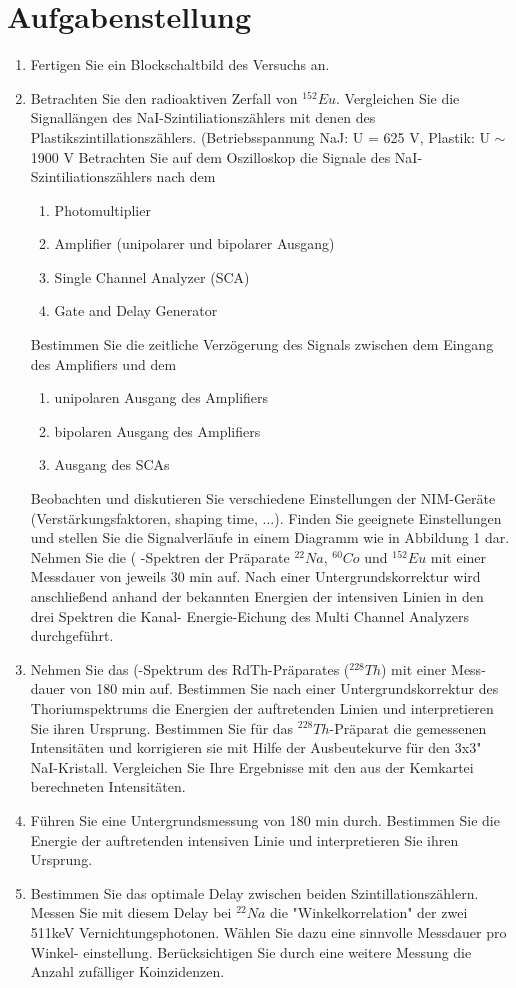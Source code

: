 \section{Aufgabenstellung}
\begin{enumerate}
 \item Fertigen Sie ein Blockschaltbild des Versuchs an.
 \item Betrachten Sie den radioaktiven Zerfall von $^{152}Eu$.
	Vergleichen Sie die Signallängen des NaI-Szintiliationszählers mit denen des
	Plastikszintillationszählers. (Betriebsspannung NaJ: U = 625 V, Plastik: U $\sim$ 1900 V
	Betrachten Sie auf dem Oszilloskop die Signale des NaI-Szintiliationszählers
	nach dem
	\begin{enumerate}
	\item Photomultiplier
	\item Amplifier (unipolarer und bipolarer Ausgang)
	\item Single Channel Analyzer (SCA)
	\item Gate and Delay Generator
	\end{enumerate}
	Bestimmen Sie die zeitliche Verzögerung des Signals zwischen dem Eingang
	des Amplifiers und dem
	\begin{enumerate}
	 \item unipolaren Ausgang des Amplifiers
	 \item bipolaren Ausgang des Amplifiers
	 \item Ausgang des SCAs
	\end{enumerate}

	Beobachten und diskutieren Sie verschiedene Einstellungen der NIM-Geräte
	(Verstärkungsfaktoren, shaping time, ...). Finden Sie geeignete Einstellungen
	und stellen Sie die Signalverläufe in einem Diagramm wie in Abbildung 1 dar.
	Nehmen Sie die ( -Spektren der Präparate $^{22}Na$, $^{60}Co$ und $^{152}Eu$ mit einer Messdauer
	von jeweils 30 min auf. Nach einer Untergrundskorrektur wird anschließend anhand
	der bekannten Energien der intensiven Linien in den drei Spektren die Kanal-
	Energie-Eichung des Multi Channel Analyzers durchgeführt.
\item Nehmen Sie das (-Spektrum des RdTh-Präparates ($^{228}Th$) mit einer Mess-
dauer von 180 min auf. Bestimmen Sie nach einer Untergrundskorrektur des
Thoriumspektrums die Energien der auftretenden Linien und interpretieren Sie ihren
Ursprung. Bestimmen Sie für das $^{228}Th$-Präparat die gemessenen Intensitäten und
korrigieren sie mit Hilfe der Ausbeutekurve für den 3x3" NaI-Kristall. Vergleichen Sie
Ihre Ergebnisse mit den aus der Kemkartei berechneten Intensitäten.
\item Führen Sie eine Untergrundsmessung von 180 min durch. Bestimmen Sie die
Energie der auftretenden intensiven Linie und interpretieren Sie ihren Ursprung.
\item Bestimmen Sie das optimale Delay zwischen beiden Szintillationszählern.
Messen Sie mit diesem Delay bei $^{22}Na$ die "Winkelkorrelation" der zwei 511keV
Vernichtungsphotonen. Wählen Sie dazu eine sinnvolle Messdauer pro Winkel-
einstellung.
Berücksichtigen Sie durch eine weitere Messung die Anzahl zufälliger
Koinzidenzen.


\end{enumerate}
